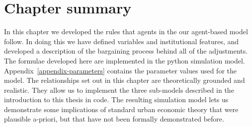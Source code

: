  
\section{Chapter summary}
In this chapter we developed  the  rules that agents in the our agent-based model follow. In doing this we have defined variables and institutional features, and developed a description of the bargaining process behind all of the adjustments. The formulae developed here are implemented in the python simulation model. Appendix~\ref{appendix-parameters} contains the parameter values used for the model.  %
The relationships set out in this chapter are theoretically grounded and  realistic. They allow us to implement the three sub-models described in the introduction to this thesis in code. The resulting simulation model lets us demonstrate some implications of standard urban economic theory that were plausible a-priori, but that have not been formally demonstrated before.  
